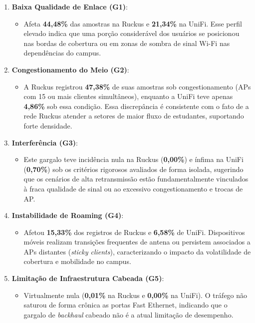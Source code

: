 \begin{enumerate}
  \item \textbf{Baixa Qualidade de Enlace (G1)}:
  \begin{itemize}
    \item Afeta \textbf{44,48\%} das amostras na Ruckus e \textbf{21,34\%} na UniFi. Esse perfil elevado indica que uma porção considerável dos usuários se posicionou nas bordas de cobertura ou em zonas de sombra de sinal Wi-Fi nas dependências do campus.
\end{itemize}
  \item \textbf{Congestionamento do Meio (G2)}:
  \begin{itemize}
    \item A Ruckus registrou \textbf{47,38\%} de suas amostras sob congestionamento (APs com 15 ou mais clientes simultâneos), enquanto a UniFi teve apenas \textbf{4,86\%} sob essa condição. Essa discrepância é consistente com o fato de a rede Ruckus atender a setores de maior fluxo de estudantes, suportando forte densidade.
\end{itemize}
  \item \textbf{Interferência (G3)}:
  \begin{itemize}
    \item Este gargalo teve incidência nula na Ruckus (\textbf{0,00\%}) e ínfima na UniFi (\textbf{0,70\%}) sob os critérios rigorosos avaliados de forma isolada, sugerindo que os cenários de alta retransmissão estão fundamentalmente vinculados à fraca qualidade de sinal ou ao excessivo congestionamento e trocas de AP.
\end{itemize}
  \item \textbf{Instabilidade de Roaming (G4)}:
  \begin{itemize}
    \item Afetou \textbf{15,33\%} dos registros de Ruckus e \textbf{6,58\%} de UniFi. Dispositivos móveis realizam transições frequentes de antena ou persistem associados a APs distantes (\textit{sticky clients}), caracterizando o impacto da volatilidade de cobertura e mobilidade no campus.
\end{itemize}
  \item \textbf{Limitação de Infraestrutura Cabeada (G5)}:
  \begin{itemize}
    \item Virtualmente nula (\textbf{0,01\%} na Ruckus e \textbf{0,00\%} na UniFi). O tráfego não saturou de forma crônica as portas Fast Ethernet, indicando que o gargalo de \textit{backhaul} cabeado não é a atual limitação de desempenho.


\end{itemize}
\end{enumerate}
